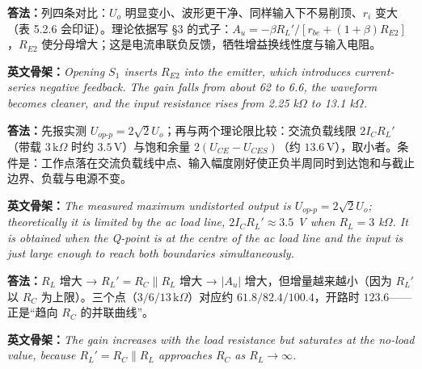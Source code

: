 \documentclass[11pt]{ctexart}
\let\origsubhdr\subhdr
\renewcommand{\subhdr}[1]{\needspace{3\baselineskip}\origsubhdr{#1}}
\begin{document}


\textbf{答法：}列四条对比：$U_o$ 明显变小、波形更干净、同样输入下不易削顶、$r_i$ 变大（表 5.2.6 会印证）。理论依据写 §3 的式子：$A_u=-\beta R_L'/[r_{be}+(1+\beta)R_{E2}]$，$R_{E2}$ 使分母增大；这是电流串联负反馈，牺牲增益换线性度与输入电阻。

\textbf{英文骨架：}\textit{Opening $S_1$ inserts $R_{E2}$ into the emitter, which introduces current-series negative feedback. The gain falls from about 62 to 6.6, the waveform becomes cleaner, and the input resistance rises from 2.25 k$\Omega$ to 13.1 k$\Omega$.}



\textbf{答法：}先报实测 $U_{op\text{-}p}=2\sqrt2U_o$；再与两个理论限比较：交流负载线限 $2I_CR_L'$（带载 $3\,\mathrm{k}\Omega$ 时约 $3.5\,\mathrm{V}$）与饱和余量 $2(U_{CE}-U_{CES})$（约 $13.6\,\mathrm{V}$），取小者。条件是：工作点落在交流负载线中点、输入幅度刚好使正负半周同时到达饱和与截止边界、负载与电源不变。

\textbf{英文骨架：}\textit{The measured maximum undistorted output is $U_{op\text{-}p}=2\sqrt2U_o$; theoretically it is limited by the ac load line, $2I_CR_L'\approx3.5$ V when $R_L=3$ k$\Omega$. It is obtained when the Q-point is at the centre of the ac load line and the input is just large enough to reach both boundaries simultaneously.}



\textbf{答法：}$R_L$ 增大 → $R_L'=R_C\parallel R_L$ 增大 → $|A_u|$ 增大，但增量越来越小（因为 $R_L'$ 以 $R_C$ 为上限）。三个点（$3/6/13\,\mathrm{k}\Omega$）对应约 $61.8/82.4/100.4$，开路时 $123.6$——正是“趋向 $R_C$ 的并联曲线”。

\textbf{英文骨架：}\textit{The gain increases with the load resistance but saturates at the no-load value, because $R_L'=R_C\parallel R_L$ approaches $R_C$ as $R_L\to\infty$.}
\end{document}
